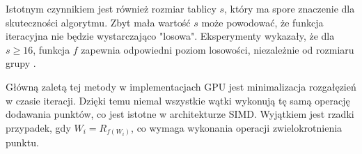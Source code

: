 Istotnym czynnikiem jest również rozmiar tablicy $s$, który ma spore znaczenie
dla skuteczności algorytmu. Zbyt mała 
wartość $s$ może powodować, że funkcja iteracyjna nie będzie wystarczająco 
"losowa". Eksperymenty wykazały, że dla $s \geq 16$, funkcja $f$ zapewnia 
odpowiedni poziom losowości, niezależnie od rozmiaru grupy \cite{Teske2000}.

Główną zaletą tej metody w implementacjach GPU jest minimalizacja rozgałęzień 
w czasie iteracji. Dzięki temu niemal wszystkie wątki wykonują tę samą operację 
dodawania punktów, co jest istotne w architekturze SIMD. Wyjątkiem jest rzadki przypadek, gdy $W_i = R_{f(W_i)}$, co 
wymaga wykonania operacji zwielokrotnienia punktu.
